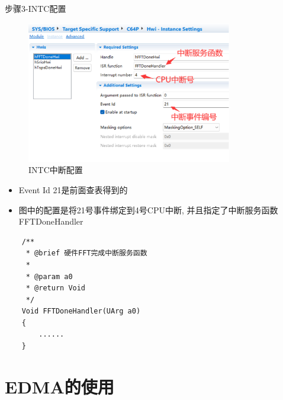 \documentclass[10pt]{ctexbeamer}
\begin{document}
    \begin{frame}{步骤3-INTC配置}
        \begin{figure}
            \centering
            \includegraphics[width=0.8\textwidth]{summary/6.eps}
            \caption{INTC中断配置}
        \end{figure}
        \begin{itemize}
            \setlength{\itemsep}{0.3cm}
            \item Event Id 21是前面查表得到的
            \item 图中的配置是将21号事件绑定到4号CPU中断, 并且指定了中断服务函数FFTDoneHandler
        \end{itemize}
        \scriptsize
        \begin{verbatim}
    /**
     * @brief 硬件FFT完成中断服务函数
     * 
     * @param a0 
     * @return Void 
     */
    Void FFTDoneHandler(UArg a0)
    {
        ......
    }
        \end{verbatim}
    \end{frame}

\section{EDMA的使用}
\end{document}
